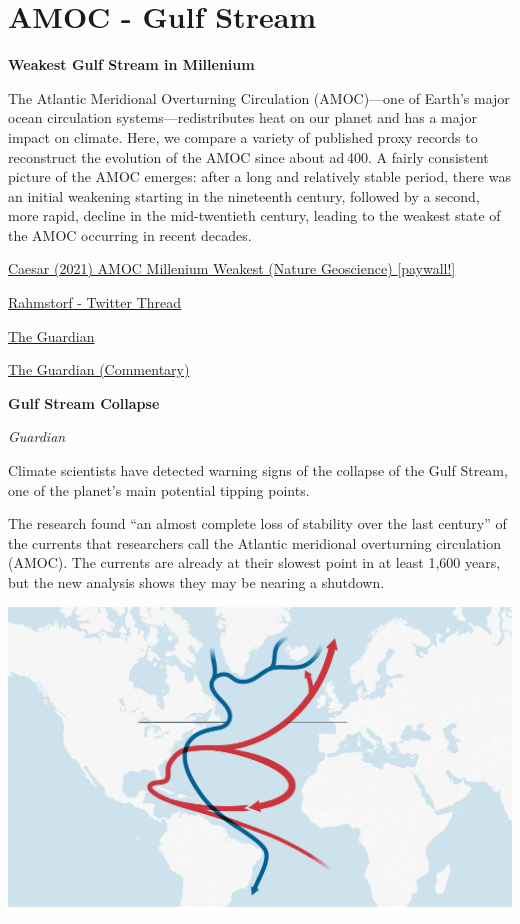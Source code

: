 \documentclass[
]{book}
\begin{document}
\hypertarget{amoc---gulf-stream}{%
\section{AMOC - Gulf Stream}\label{amoc---gulf-stream}}

\textbf{Weakest Gulf Stream in Millenium}

The Atlantic Meridional Overturning Circulation (AMOC)---one of Earth's major ocean circulation systems---redistributes heat on our planet and has a major impact on climate. Here, we compare a variety of published proxy records to reconstruct the evolution of the AMOC since about ad 400. A fairly consistent picture of the AMOC emerges: after a long and relatively stable period, there was an initial weakening starting in the nineteenth century, followed by a second, more rapid, decline in the mid-twentieth century, leading to the weakest state of the AMOC occurring in recent decades.

\href{https://www.nature.com/articles/s41561-021-00699-z}{Caesar (2021) AMOC Millenium Weakest (Nature Geoscience) {[}paywall!{]}}

\href{https://twitter.com/rahmstorf/status/1364976597250568194}{Rahmstorf - Twitter Thread}

\href{https://www.theguardian.com/environment/2021/feb/25/atlantic-ocean-circulation-at-weakest-in-a-millennium-say-scientists}{The Guardian}

\href{https://www.theguardian.com/commentisfree/2021/feb/26/atlantic-currents-climate-oceans-next-century}{The Guardian (Commentary)}

\textbf{Gulf Stream Collapse}

\emph{Guardian}

Climate scientists have detected warning signs of the collapse of the Gulf Stream, one of the planet's main potential tipping points.

The research found ``an almost complete loss of stability over the last century'' of the currents that researchers call the Atlantic meridional overturning circulation (AMOC). The currents are already at their slowest point in at least 1,600 years, but the new analysis shows they may be nearing a shutdown.

\includegraphics{fig/north_atlantic_circulation.png}
\end{document}
